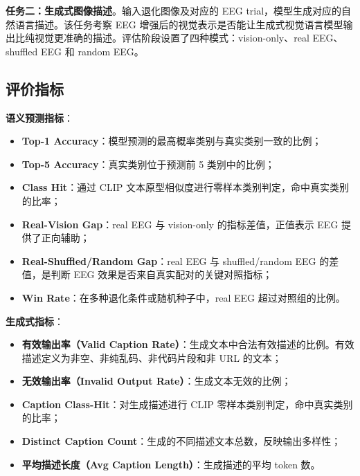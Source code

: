 \textbf{任务二：生成式图像描述}。输入退化图像及对应的 EEG trial，模型生成对应的自然语言描述。该任务考察 EEG 增强后的视觉表示是否能让生成式视觉语言模型输出比纯视觉更准确的描述。评估阶段设置了四种模式：vision-only、real EEG、shuffled EEG 和 random EEG。

\subsection{评价指标}

\textbf{语义预测指标}：

\begin{itemize}
  \item \textbf{Top-1 Accuracy}：模型预测的最高概率类别与真实类别一致的比例；
  \item \textbf{Top-5 Accuracy}：真实类别位于预测前 5 类别中的比例；
  \item \textbf{Class Hit}：通过 CLIP 文本原型相似度进行零样本类别判定，命中真实类别的比率；
  \item \textbf{Real-Vision Gap}：real EEG 与 vision-only 的指标差值，正值表示 EEG 提供了正向辅助；
  \item \textbf{Real-Shuffled/Random Gap}：real EEG 与 shuffled/random EEG 的差值，是判断 EEG 效果是否来自真实配对的关键对照指标；
  \item \textbf{Win Rate}：在多种退化条件或随机种子中，real EEG 超过对照组的比例。
\end{itemize}

\textbf{生成式指标}：

\begin{itemize}
  \item \textbf{有效输出率（Valid Caption Rate）}：生成文本中合法有效描述的比例。有效描述定义为非空、非纯乱码、非代码片段和非 URL 的文本；
  \item \textbf{无效输出率（Invalid Output Rate）}：生成文本无效的比例；
  \item \textbf{Caption Class-Hit}：对生成描述进行 CLIP 零样本类别判定，命中真实类别的比率；
  \item \textbf{Distinct Caption Count}：生成的不同描述文本总数，反映输出多样性；
  \item \textbf{平均描述长度（Avg Caption Length）}：生成描述的平均 token 数。
\end{itemize}
